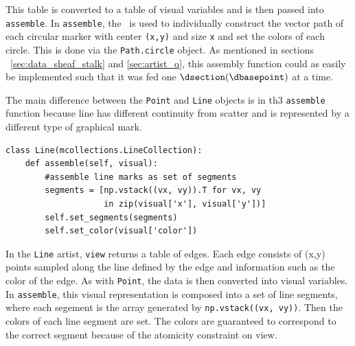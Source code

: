 \documentclass[../main.tex]{subfiles}
\begin{document}
This table is converted to a table of visual variables and is then passed into \texttt{assemble}. In  \texttt{assemble}, the \vsection\ is used to individually construct the vector path of each circular marker with center \texttt{(x,y)} and size \texttt{x} and set the colors of each circle. This is done via the \texttt{Path.circle} object. As mentioned in sections ~\ref{sec:data_sheaf_stalk} and \ref{sec:artist_q}, this assembly function could as easily be implemented such that it was fed one $\dsection(\dbasepoint)$ at a time. 

The main difference between the \texttt{Point} and \texttt{Line} objects is in th3 \texttt{assemble} function because line has different continuity from scatter and is represented by a different type of graphical mark. 

\begin{verbatim}
class Line(mcollections.LineCollection):
    def assemble(self, visual):
        #assemble line marks as set of segments 
        segments = [np.vstack((vx, vy)).T for vx, vy 
                    in zip(visual['x'], visual['y'])]
        self.set_segments(segments)
        self.set_color(visual['color'])
\end{verbatim}
In the \texttt{Line} artist, \texttt{view} returns a table of edges. Each edge consists of (x,y) points sampled along the line defined by the edge and information such as the color of the edge. As with \texttt{Point}, the data is then converted into visual variables. In \texttt{assemble}, this visual representation is composed into a set of line segments, where each segement is the array generated by \texttt{np.vstack((vx, vy))}. Then the colors of each line segment are set. The colors are guaranteed to correspond to the correct segment because of the atomicity constraint on view. 
\end{document}
